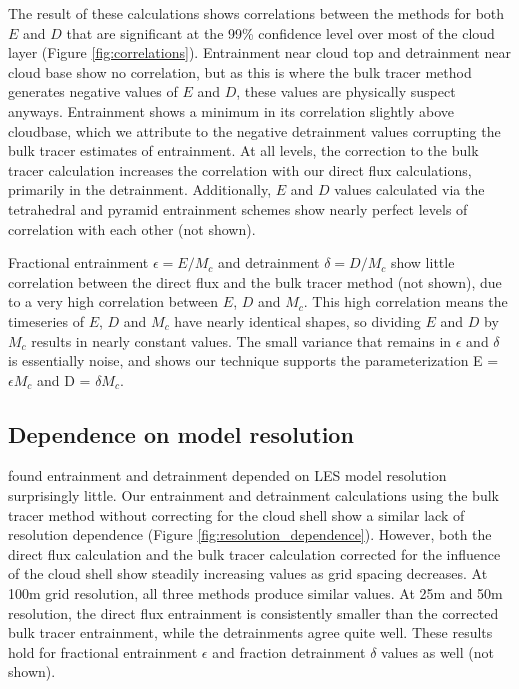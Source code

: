 \documentclass[12pt]{article}
\begin{document}
The result of these calculations shows correlations between the methods for 
both $E$ and $D$ that are significant at the 99\% confidence level over most 
of the cloud layer (Figure \ref{fig:correlations}).  Entrainment near cloud top
and detrainment near cloud base show no correlation, but as this is where the 
bulk tracer method generates negative values of $E$ and $D$, these values are 
physically suspect anyways.  Entrainment shows a minimum in its correlation 
slightly above cloudbase, which we attribute to the negative detrainment values 
corrupting the bulk tracer estimates of entrainment.  At all levels, the 
correction to the bulk tracer calculation increases the correlation with our 
direct flux calculations, primarily in the detrainment. Additionally, $E$ and 
$D$ values calculated via the tetrahedral and pyramid entrainment schemes show 
nearly perfect levels of correlation with each other (not shown).

Fractional entrainment $\epsilon = E/M_c$ and detrainment $\delta = D/M_c$ show 
little correlation between the direct flux and the bulk tracer method (not 
shown), due to a very high correlation between $E$, $D$ and $M_c$.  This high 
correlation means the timeseries of $E$, $D$ and $M_c$ have nearly identical 
shapes, so dividing $E$ and $D$ by $M_c$ results in nearly constant values. The
small variance that remains in $\epsilon$ and $\delta$ is essentially noise, 
and shows our technique supports the parameterization E = $\epsilon M_c$ and 
D = $\delta M_c$.


\subsection{Dependence on model resolution}

\cite{Brown1999} found entrainment and detrainment depended on LES model 
resolution surprisingly little.  Our entrainment and detrainment calculations 
using the bulk tracer method without correcting for the cloud shell show a
similar lack of resolution dependence (Figure \ref{fig:resolution_dependence}).
However, both the direct flux calculation and the bulk tracer calculation 
corrected for the influence of the cloud shell show steadily increasing values 
as grid spacing decreases.  At 100m grid resolution, all three methods produce
similar values.  At 25m and 50m resolution, the direct flux entrainment is 
consistently smaller than the corrected bulk tracer entrainment, while the 
detrainments agree quite well.  These results hold for fractional entrainment 
$\epsilon$ and fraction detrainment $\delta$ values as well (not shown).  
\end{document}
